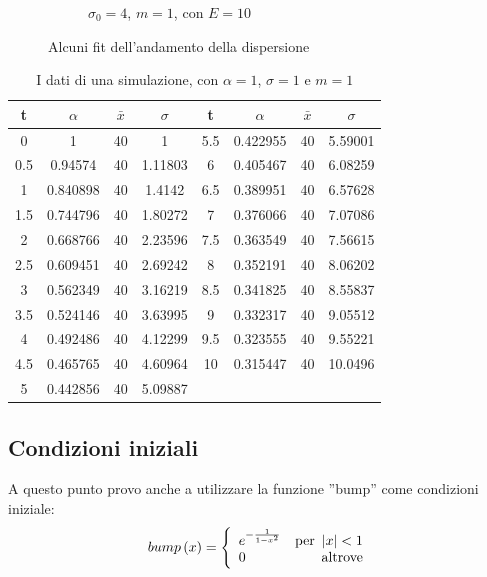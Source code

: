 \begin{figure}[h]
\begin{subfigure}[b]{0.3\textwidth}
		\caption{$\sigma_0=4$, $m=1$, con $E=10$}
	\end{subfigure}
	\caption{Alcuni fit dell'andamento della dispersione}\label{fig:dispersioneFitE}
\end{figure}

\begin{table}
	\centering
\begin{tabular}{cccc|cccc}
	\toprule
	t	&$\alpha$	&$\bar x$& $\sigma$ &	t	&	$\alpha$	&$\bar x$& $\sigma$\\ \toprule
	0   & 1        & 40 & 1       & 5.5 & 0.422955 & 40 & 5.59001 \\ \midrule
	0.5 & 0.94574  & 40 & 1.11803 & 6   & 0.405467 & 40 & 6.08259 \\ \midrule
	1   & 0.840898 & 40 & 1.4142  & 6.5 & 0.389951 & 40 & 6.57628 \\ \midrule
	1.5 & 0.744796 & 40 & 1.80272 & 7   & 0.376066 & 40 & 7.07086 \\ \midrule
	2   & 0.668766 & 40 & 2.23596 & 7.5 & 0.363549 & 40 & 7.56615 \\ \midrule
	2.5 & 0.609451 & 40 & 2.69242 & 8   & 0.352191 & 40 & 8.06202 \\ \midrule
	3   & 0.562349 & 40 & 3.16219 & 8.5 & 0.341825 & 40 & 8.55837 \\ \midrule
	3.5 & 0.524146 & 40 & 3.63995 & 9   & 0.332317 & 40 & 9.05512 \\ \midrule
	4   & 0.492486 & 40 & 4.12299 & 9.5 & 0.323555 & 40 & 9.55221 \\ \midrule
	4.5 & 0.465765 & 40 & 4.60964 & 10  & 0.315447 & 40 & 10.0496 \\ \midrule
	5   & 0.442856 & 40 & 5.09887 &     &          &    &         \\ \bottomrule
\end{tabular}
\caption{I dati di una simulazione, con $\alpha = 1$, $\sigma=1$ e $m=1$ }\label{table:dispersioneg1}
\end{table}

\subsection{Condizioni iniziali}
A questo punto provo anche a utilizzare la funzione ''bump'' come condizioni iniziale:
\begin{equation}
bump\lrt{x} = \lr\{.{\begin{array}{lr}
e^{-\frac{1}{1-x^2}}&\text{per }\lr||{x}<1\\
0&\text{altrove}
\end{array}}
\end{equation}

